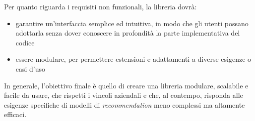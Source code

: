 Per quanto riguarda i requisiti non funzionali, la libreria dovrà:

\begin{itemize}
    \item garantire un'interfaccia semplice ed intuitiva, in modo che gli utenti possano adottarla senza dover conoscere in profondità la parte implementativa del codice
    \item essere modulare, per permettere estensioni e adattamenti a diverse esigenze o casi d'uso
\end{itemize}

In generale, l'obiettivo finale è quello di creare una libreria modulare, scalabile e facile da usare, che rispetti i vincoli aziendali e che, al contempo, risponda alle esigenze specifiche di modelli di \textit{recommendation} meno complessi ma altamente efficaci.




